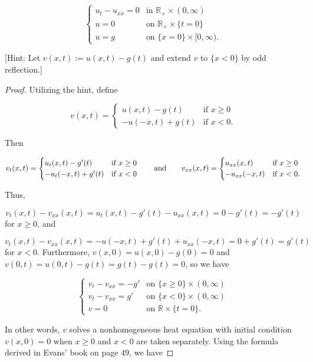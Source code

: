 \documentclass[11pt,oneside,english]{amsart}
\theoremstyle{definition}
\newcommand{\aspace}{\hspace{7mm}\text{and}\hspace{7mm}}
\newcommand{\MB}[1]{\mathbb{#1}}
\begin{document}
\begin{enumerate}
\[
\begin{cases}u_t-u_{xx}=0 & \text{in }\MB{R}_+\times(0,\infty)\\ u=0 & \text{on }\MB{R}_+\times\{t=0\}\\ u=g & \text{on }\{x=0\}\times[0,\infty).\end{cases} 
\]

[Hint: Let $v(x,t):=u(x,t)-g(t)$ and extend $v$ to $\{x<0\}$ by odd reflection.]

\begin{proof}
Utilizing the hint, define

\[
v(x,t)=\begin{cases}u(x,t)-g(t) & \text{if }x\geq 0\\ -u(-x,t)+g(t) & \text{if }x<0.\end{cases}
\]

Then

\[
v_t(x,t)=\begin{cases}u_t(x,t)-g'(t) & \text{if } x\geq0\\ -u_t(-x,t)+g'(t) & \text{if }x<0\end{cases}\aspace v_{xx}(x,t)=\begin{cases}u_{xx}(x,t) & \text{if }x\geq0 \\ -u_{xx}(-x,t) & \text{if }x<0.\end{cases}
\]

Thus,

\[
v_t(x,t)-v_{xx}(x,t)=u_t(x,t)-g'(t)-u_{xx}(x,t)=0-g'(t)=-g'(t)
\]
for $x\geq0$, and

\[
v_t(x,t)-v_{xx}(x,t)=-u(-x,t)+g'(t)+u_{xx}(-x,t)=0+g'(t)=g'(t)
\]
for $x<0$. Furthermore, $v(x,0)=u(x,0)-g(0)=0$ and $v(0,t)=u(0,t)-g(t)=g(t)-g(t)=0$, so we have

\[
\begin{cases}v_t-v_{xx}=-g' & \text{on }\{x\geq0\}\times(0,\infty)\\ 
v_t-v_{xx}=g' &  \text{on }\{x<0\}\times(0,\infty)\\
v=0 & \text{on }\MB{R}\times\{t=0\}. \end{cases}
\]

In other words, $v$ solves a nonhomogeneous heat equation with initial condition $v(x,0)=0$ when $x\geq0$ and $x<0$ are taken separately. Using the formula derived in Evans' book on page 49, we have


\end{proof}
\end{enumerate}
\end{document}
